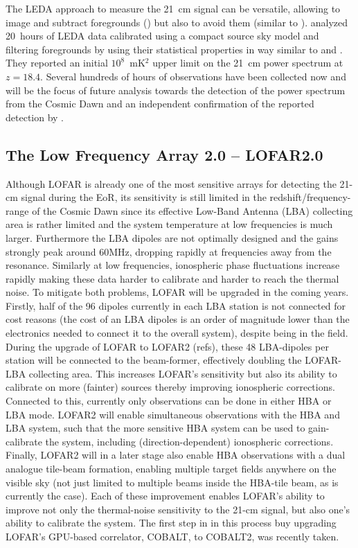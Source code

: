 %
The LEDA approach to measure the 21~cm signal can be versatile, allowing to image and subtract foregrounds (\cite{eastwood18}) but also to avoid them (similar to \cite{beardsley16}). \cite{eastwood19} analyzed 20~hours of LEDA data calibrated using a compact source sky model and filtering foregrounds by using their statistical properties in way similar to \cite{dillon14} and \cite{trott16}. They reported an initial $10^8$~mK$^2$ upper limit on the 21~cm power spectrum at $z = 18.4$. Several hundreds of hours of observations have been collected now and will be the focus of future analysis towards the detection of the power spectrum from the Cosmic Dawn and an independent confirmation of the reported detection by \cite{bowman18}.

\subsection{The Low Frequency Array 2.0 -- LOFAR2.0}
\label{section:lofar}

Although LOFAR is already one of the most sensitive arrays for detecting the 21-cm signal during the EoR, its sensitivity is still limited in the redshift/frequency-range of the Cosmic Dawn since its effective Low-Band Antenna (LBA) collecting area is rather limited and the system temperature at low frequencies is much larger. Furthermore the LBA dipoles are not optimally designed and the gains strongly peak around 60MHz, dropping rapidly at frequencies away from the resonance. Similarly at low frequencies,  ionospheric phase fluctuations increase rapidly making these data harder to calibrate and harder to reach the thermal noise. To mitigate both problems, LOFAR will be upgraded in the coming years. Firstly, half of the 96 dipoles currently in each LBA station is not connected for cost reasons (the cost of an LBA dipoles is an order of magnitude lower than the electronics needed to connect it to the overall system), despite being in the field. During the upgrade of LOFAR to LOFAR2 (refs), these 48 LBA-dipoles per station will be connected to the beam-former, effectively doubling the LOFAR-LBA collecting area. This increases LOFAR's sensitivity but also its ability to calibrate on more (fainter) sources thereby improving ionospheric corrections. Connected to this, currently only observations can be done in either HBA or LBA mode. LOFAR2 will enable simultaneous observations with the HBA and LBA system, such that the more sensitive HBA system can be used to gain-calibrate the system, including (direction-dependent) ionospheric corrections. Finally, LOFAR2 will in a later stage also enable HBA observations with a dual analogue tile-beam formation, enabling multiple target fields anywhere on the visible sky (not just limited to multiple beams inside the HBA-tile beam, as is currently the case). Each of these improvement enables LOFAR's ability to improve not only the thermal-noise sensitivity to the 21-cm signal, but also one's ability to calibrate the system. The first step in in this process buy upgrading LOFAR's GPU-based correlator, COBALT, to COBALT2, was recently taken.  

